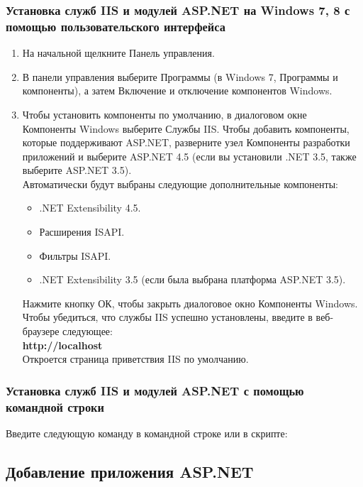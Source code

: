 \documentclass[12pt,a4paper,titlepage]{article}
\begin{document}
\subsubsection{Установка служб IIS и модулей ASP.NET на Windows 7, 8  с помощью пользовательского интерфейса}
\begin{enumerate}
\item На начальной щелкните Панель управления.
\item В панели управления выберите Программы (в Windows 7, Программы и компоненты), а затем Включение и отключение компонентов Windows.
\item Чтобы установить компоненты по умолчанию, в диалоговом окне Компоненты Windows выберите Службы IIS.
Чтобы добавить компоненты, которые поддерживают ASP.NET, разверните узел Компоненты разработки приложений и выберите ASP.NET 4.5 (если вы установили .NET 3.5, также выберите ASP.NET 3.5).
\\Автоматически будут выбраны следующие дополнительные компоненты:\\
	\begin{itemize}
	\item .NET Extensibility 4.5.
	\item Расширения ISAPI.
	\item Фильтры ISAPI.
	\item .NET Extensibility 3.5 (если была выбрана платформа ASP.NET 3.5).
	\end{itemize}
Нажмите кнопку ОК, чтобы закрыть диалоговое окно Компоненты Windows.
Чтобы убедиться, что службы IIS успешно установлены, введите в веб-браузере следующее:
\\\textbf{http://localhost}\\
Откроется страница приветствия IIS по умолчанию.
\end{enumerate}
\subsubsection{Установка служб IIS и модулей ASP.NET с помощью командной строки}
Введите следующую команду в командной строке или в скрипте:


\subsection{Добавление приложения ASP.NET}
\end{document}

